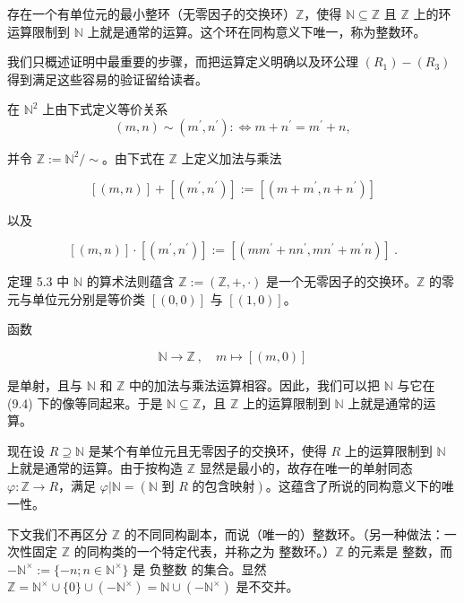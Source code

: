 \begin{theorem}

存在一个有单位元的最小整环（无零因子的交换环）$\mathbb{Z}$，使得 $\mathbb{N} \subseteq \mathbb{Z}$ 且 $\mathbb{Z}$ 上的环运算限制到 $\mathbb{N}$ 上就是通常的运算。这个环在同构意义下唯一，称为整数环。

\proofhead
我们只概述证明中最重要的步骤，而把运算定义明确以及环公理 $ (R_1)-(R_3) $ 得到满足这些容易的验证留给读者。

在 $ \mathbb{N}^{2} $ 上由下式定义等价关系
\[
(m,n)\sim(m^{\prime},n^{\prime}):\Longleftrightarrow m+n^{\prime}=m^{\prime}+n,
\]

并令 $ \mathbb{Z} := \mathbb{N}^2 / \sim $。由下式在 $ \mathbb{Z} $ 上定义加法与乘法

\[
[(m,n)]+[(m^{\prime},n^{\prime})]:=[(m+m^{\prime},n+n^{\prime})]
\]

以及

\[
[(m,n)]\cdot[(m^{\prime},n^{\prime})]:=[(m m^{\prime}+n n^{\prime},m n^{\prime}+m^{\prime}n)]~.
\]

定理 5.3 中 $ \mathbb{N} $ 的算术法则蕴含 $ \mathbb{Z} := (\mathbb{Z}, +, \cdot) $ 是一个无零因子的交换环。$ \mathbb{Z} $ 的零元与单位元分别是等价类 $ [(0, 0)] $ 与 $ [(1, 0)] $。

函数

\begin{equation}
\mathbb{N}\to\mathbb{Z}~,\quad m\mapsto\left[(m,0)\right]
\end{equation}

是单射，且与 $ \mathbb{N} $ 和 $ \mathbb{Z} $ 中的加法与乘法运算相容。因此，我们可以把 $ \mathbb{N} $ 与它在 (9.4) 下的像等同起来。于是 $ \mathbb{N} \subseteq \mathbb{Z} $，且 $ \mathbb{Z} $ 上的运算限制到 $ \mathbb{N} $ 上就是通常的运算。

现在设 $ R \supseteq \mathbb{N} $ 是某个有单位元且无零因子的交换环，使得 $ R $ 上的运算限制到 $ \mathbb{N} $ 上就是通常的运算。由于按构造 $ \mathbb{Z} $ 显然是最小的，故存在唯一的单射同态 $ \varphi: \mathbb{Z} \to R $，满足 $ \varphi | \mathbb{N} = (\mathbb{N} \text{ 到 } R \text{ 的包含映射}) $。这蕴含了所说的同构意义下的唯一性。

下文我们不再区分 $ \mathbb{Z} $ 的不同同构副本，而说（唯一的）$ \mathbf{整数环} $。（另一种做法：一次性固定 $ \mathbb{Z} $ 的同构类的一个特定代表，并称之为 $ \mathbf{整数环} $。）$ \mathbb{Z} $ 的元素是 $ \mathbf{整数} $，而 $ -\mathbb{N}^\times := \{-n; n \in \mathbb{N}^\times\} $ 是 $ \mathbf{负整数} $ 的集合。显然 $ \mathbb{Z} = \mathbb{N}^\times \cup \{0\} \cup (-\mathbb{N}^\times) = \mathbb{N} \cup (-\mathbb{N}^\times) $ 是不交并。

\end{theorem}

